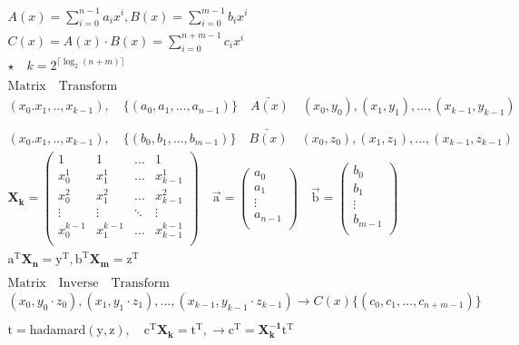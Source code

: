 \documentclass{article}
\begin{document}
\begin{align*}
    A(x) = \sum_{i=0}^{n-1}a_{i}x^{i}, B(x) = \sum_{i=0}^{m-1}b_{i}x^{i} \\
    C(x) = A(x) \cdot B(x) = \sum_{i=0}^{n+m-1}c_{i}x^{i} \\ 
    \star \quad k = 2^{\lceil\log_{2}(n+m)\rceil}\\
    \\
   \mathrm{Matrix \quad Transform}\\
    (x_{0}.x_{1},..,x_{k-1}), \quad \{(a_{0},a_{1},...,a_{n-1})\} \quad \underrightarrow{A(x)} \quad (x_{0},y_{0}),(x_{1},y_{1}),...,(x_{k-1},y_{k-1}) \\
    \\
    (x_{0}.x_{1},..,x_{k-1}), \quad \{(b_{0},b_{1},...,b_{m-1})\} \quad \underrightarrow{B(x)} \quad (x_{0},z_{0}),(x_{1},z_{1}),...,(x_{k-1},z_{k-1}) \\
    \mathbf{X_{k}} = \left(
        \begin{array}{cccc}
            1 & 1 & ... &1 \\ 
            x_{0}^{1} & x_{1}^{1} & ... & x_{k-1}^{1} \\ 
            x_{0}^{2} & x_{1}^{2} & ... & x_{k-1}^{2}\\  
            \vdots & \vdots & \ddots & \vdots \\ 
            x_{0}^{k-1} & x_{1}^{k-1} & ... & x_{k-1}^{k-1}\\
        \end{array}
    \right) \quad \vec{\mathrm{a}} = \left(
        \begin{array}{c}
            a_{0} \\
            a_{1} \\  
            \vdots \\
            a_{n-1} \\ 
         \end{array}
    \right) \quad \vec{\mathrm{b}} = \left(
        \begin{array}{c}
            b_{0} \\
            b_{1} \\  
            \vdots \\
            b_{m-1} \\ 
         \end{array}
    \right)\\
    \mathrm{a}^{\mathrm{T}} \mathbf{X_{n}} = \mathrm{y}^{\mathrm{T}} ,     \mathrm{b}^{\mathrm{T}} \mathbf{X_{m}} = \mathrm{z}^{\mathrm{T}} \\    
    \\
    \mathrm{Matrix \quad Inverse \quad Transform}\\
    (x_{0},y_{0}\cdot z_{0}),(x_{1},y_{1}\cdot z_{1}),...,(x_{k-1},y_{k-1}\cdot z_{k-1}) \rightarrow C(x)\{(c_{0},c_{1},...,c_{n+m-1})\}\\ 
    \\
    \mathrm{t} = \mathrm{hadamard(y,z)}, \quad \mathrm{c^{\mathrm{T}}}\mathbf{X_{k}} = \mathrm{t^{\mathrm{T}}}, \rightarrow \mathrm{c^{\mathrm{T}}} = \mathbf{X_{k}^{-1}}\mathrm{t^{\mathrm{T}}}\\
\end{align*}
\end{document}

